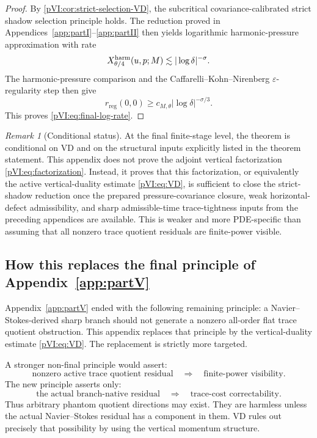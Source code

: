 \documentclass[11pt]{article}
\numberwithin{equation}{section}
\theoremstyle{plain}
\theoremstyle{definition}
\theoremstyle{remark}
\newtheorem{remark}{Remark}[section]
\newcommand{\reg}{\mathrm{reg}}
\begin{document}
\begin{proof}
By \cref{pVI:cor:strict-selection-VD}, the subcritical covariance-calibrated strict shadow selection
principle holds.  The reduction proved in Appendices~\ref{app:partI}--\ref{app:partII} then yields logarithmic harmonic-pressure
approximation with rate
\[
        X^{\rm harm}_{\theta/4}(u,p;M)
        \lesssim
        |\log\delta|^{-\sigma}.
\]
The harmonic-pressure comparison and the Caffarelli--Kohn--Nirenberg \(\varepsilon\)-regularity
step then give
\[
        r_{\reg}(0,0)
        \ge
        c_{M,\theta}|\log\delta|^{-\sigma/3}.
\]
This proves \eqref{pVI:eq:final-log-rate}.
\end{proof}

\begin{remark}[Conditional status]
At the final finite-stage level, the theorem is conditional on VD and on the structural inputs explicitly listed in the theorem statement.  This appendix does not prove the adjoint vertical factorization
\eqref{pVI:eq:factorization}.  Instead, it proves that this factorization, or equivalently the active
vertical-duality estimate \eqref{pVI:eq:VD}, is sufficient to close the strict-shadow reduction once the prepared pressure-covariance closure, weak horizontal-defect admissibility, and sharp admissible-time trace-tightness inputs from the preceding appendices are available.  This is weaker and
more PDE-specific than assuming that all nonzero trace quotient residuals are finite-power visible.
\end{remark}

\subsection{How this replaces the final principle of Appendix~\ref{app:partV}}

Appendix~\ref{app:partV} ended with the following remaining principle: a Navier--Stokes-derived sharp branch should
not generate a nonzero all-order flat trace quotient obstruction.  This appendix replaces that
principle by the vertical-duality estimate \eqref{pVI:eq:VD}.  The replacement is strictly more targeted.

A stronger non-final principle would assert:
\[
        \text{nonzero active trace quotient residual}
        \quad\Longrightarrow\quad
        \text{finite-power visibility}.
\]
The new principle asserts only:
\[
        \text{the actual branch-native residual}
        \quad\Longrightarrow\quad
        \text{trace-cost correctability}.
\]
Thus arbitrary phantom quotient directions may exist.  They are harmless unless the actual
Navier--Stokes residual has a component in them.  VD rules out precisely that possibility by using
the vertical momentum structure.
\end{document}
